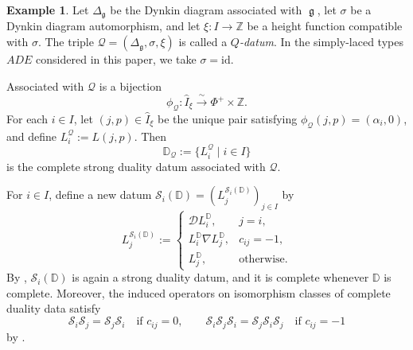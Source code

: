 \documentclass[12pt, reqno]{amsart}
\theoremstyle{plain}
\theoremstyle{definition}
\newtheorem{example}[theorem]{Example}
\numberwithin{equation}{section}
\newcommand{\ZZ}{\mathbb{Z}}
\newcommand{\DD}{\mathbb{D}}
\newcommand{\fg}{\operatorname{\mathfrak{g}}}
\begin{document}
\begin{example}\label{ex:Q-datum}
Let \(\Delta_{\fg}\) be the Dynkin diagram associated with \(\fg\),
let \(\sigma\) be a Dynkin diagram automorphism, and let
\(\xi\colon I\to\ZZ\) be a height function compatible with
\(\sigma\). The triple
\(\mathcal Q=(\Delta_{\fg},\sigma,\xi)\) is called a
\emph{\(Q\)-datum}. In the simply-laced types \(ADE\) considered in
this paper, we take \(\sigma=\mathrm{id}\).

Associated with \(\mathcal Q\) is a bijection
\begin{equation*}
\phi_{\mathcal Q}\colon
\widehat I_{\xi}\xrightarrow{\ \sim\ }\Phi^+\times\ZZ.
\end{equation*}
For each \(i\in I\), let \((j,p)\in\widehat I_{\xi}\) be the unique
pair satisfying \(\phi_{\mathcal Q}(j,p)=(\alpha_i,0)\), and define
\(L_i^{\mathcal Q}:=L(j,p)\). Then
\begin{equation*}
\DD_{\mathcal Q}
:=
\{L_i^{\mathcal Q}\mid i\in I\}
\end{equation*}
is the complete strong duality datum associated with
\(\mathcal Q\).
\end{example}

For \(i\in I\), define a new datum
\(\mathscr S_i(\DD)=(L_j^{\mathscr S_i(\DD)})_{j\in I}\) by
\begin{equation}\label{eq:duality-datum-braid-action}
    L_j^{\mathscr S_i(\DD)}
    :=\begin{cases}
        \mathcal D L_i^{\DD},
        & j=i,\\
        L_i^{\DD}\nabla L_j^{\DD},
        & c_{ij}=-1,\\
        L_j^{\DD},
        & \text{otherwise}.
    \end{cases}
\end{equation}
By \cite[Proposition~5.9]{kashiwara2023pbw},
\(\mathscr S_i(\DD)\) is again a strong duality datum, and it is complete
whenever \(\DD\) is complete. Moreover, the induced operators on
isomorphism classes of complete duality data satisfy
\begin{equation}\label{eq:duality-datum-braid-relations}
    \mathscr S_i\mathscr S_j
    =\mathscr S_j\mathscr S_i
    \quad\text{if }c_{ij}=0,
    \qquad
    \mathscr S_i\mathscr S_j\mathscr S_i
    =\mathscr S_j\mathscr S_i\mathscr S_j
    \quad\text{if }c_{ij}=-1
\end{equation}
by \cite[Corollary~3.22]{kashiwara2025monoidal}.
\end{document}
